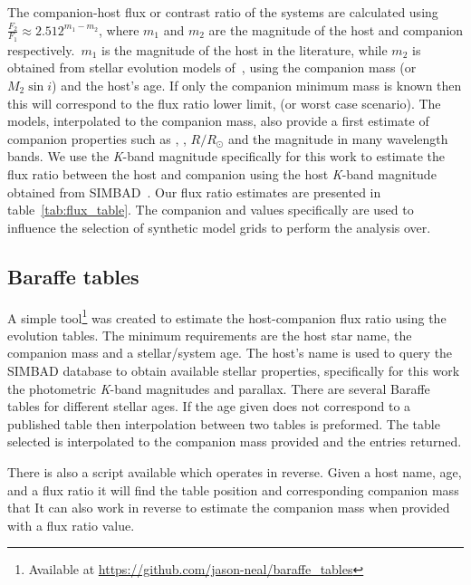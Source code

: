 \label{compaion flux ration}
The companion-host flux or contrast ratio of the systems are calculated using \(\frac{F_{2}}{F_{1}} \approx 2.512^{m_{1}-m_{2}}\), where \(m_{1}\) and \(m_{2}\) are the magnitude of the host and companion respectively.\ \(m_{1}\) is the magnitude of the host in the literature, while \(m_{2}\) is obtained from stellar evolution models of~\citet{baraffe_evolutionary_2003, baraffe_new_2015}, using the companion mass (or \(M_{2}\sin{i}\)) and the host's age. If only the companion minimum mass is known then this will correspond to the flux ratio lower limit, (or worst case scenario). The models, interpolated to the companion mass, also provide a first estimate of companion properties such as \teff{}, \logg{}, \(R/R_{\odot}\) and the magnitude in many wavelength bands.
We use the \emph{K}-band magnitude specifically for this work to estimate the flux ratio between the host and companion using the host \emph{K}-band magnitude obtained from {SIMBAD}~\citep{wenger_simbad_2000}. Our flux ratio estimates are presented in table~\ref{tab:flux_table}.
The companion \teff{} and \logg{} values specifically are used to influence the selection of synthetic model grids to perform the \textchisquared{} analysis over.

\subsection{Baraffe tables}
A simple tool\footnote{Available at \url{https://github.com/jason-neal/baraffe_tables}} was created to estimate the host-companion flux ratio using the~\citep{baraffe_evolutionary_2003,baraffe_new_2015} evolution tables. The minimum requirements are the host star name, the companion mass and a stellar/system age. The host's name is used to query the {SIMBAD} database to obtain available stellar properties, specifically for this work the photometric \textit{K}-band magnitudes and parallax. There are several Baraffe tables for different stellar ages. If the age given does not correspond to a published table then interpolation between two tables is preformed. The table selected is interpolated to the companion mass provided and the entries returned.

There is also a script available which operates in reverse. Given a host name, age, and a flux ratio it will find the table position and corresponding companion mass that It can also work in reverse to estimate the companion mass when provided with a flux ratio value.




